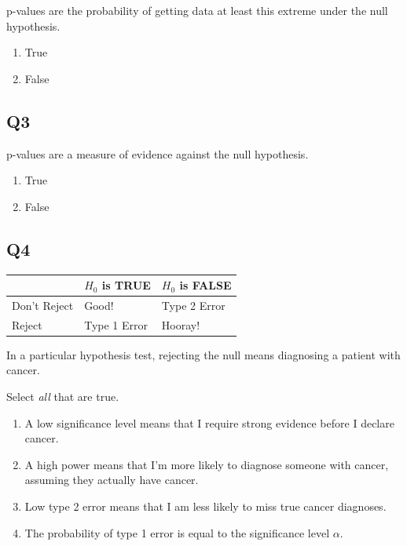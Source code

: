 \documentclass[
  letterpaper,
  DIV=11,
  numbers=noendperiod,
  oneside]{scrreprt}
\providecommand{\tightlist}{%
  \setlength{\itemsep}{0pt}\setlength{\parskip}{0pt}}\usepackage{longtable,booktabs,array}
\begin{document}
p-values are the probability of getting data at least this extreme under
the null hypothesis.

\pspace

\begin{enumerate}
\def\labelenumi{\arabic{enumi}.}
\tightlist
\item
  True
\item
  False
\end{enumerate}

\hypertarget{q3}{%
\subsection{Q3}\label{q3}}

p-values are a measure of evidence against the null hypothesis.

\pspace

\begin{enumerate}
\def\labelenumi{\arabic{enumi}.}
\tightlist
\item
  True
\item
  False
\end{enumerate}

\hypertarget{q4}{%
\subsection{Q4}\label{q4}}

\begin{longtable}[]{@{}lll@{}}
\toprule\noalign{}
& \(H_0\) is TRUE & \(H_0\) is FALSE \\
\midrule\noalign{}
\endhead
\bottomrule\noalign{}
\endlastfoot
Don't Reject & Good! & Type 2 Error \\
Reject & Type 1 Error & Hooray! \\
\end{longtable}

In a particular hypothesis test, rejecting the null means diagnosing a
patient with cancer.

Select \emph{all} that are true.

\pspace

\begin{enumerate}
\def\labelenumi{\arabic{enumi}.}
\tightlist
\item
  A low significance level means that I require strong evidence before I
  declare cancer.
\item
  A high power means that I'm more likely to diagnose someone with
  cancer, assuming they actually have cancer.
\item
  Low type 2 error means that I am less likely to miss true cancer
  diagnoses.
\item
  The probability of type 1 error is equal to the significance level
  \(\alpha\).
\end{enumerate}
\end{document}
